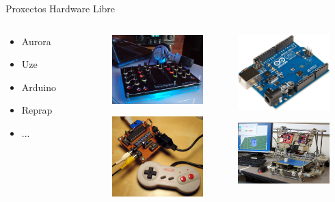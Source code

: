 \documentclass{beamer}
\begin{document}
\begin{frame}{Proxectos Hardware Libre}

\begin{columns}
\begin{column}{0.25\textwidth}
\begin{itemize}
\item Aurora
\item Uze
\item Arduino
\item Reprap
\item ...
\end{itemize}
\end{column}
\begin{column}{0.75\textwidth}

\begin{columns}
	\begin{column}{0.35\textwidth}
		\includegraphics[width=100pt]{./img/exemplo_Aurora.png}

		\includegraphics[width=100pt]{./img/exemplo_Uze.png}
	\end{column}
	\begin{column}{0.35\textwidth}
		\includegraphics[width=100pt]{./img/Arduino_Uno.png}

		\includegraphics[width=100pt]{./img/exemplo_RepRap_v2_Mendel.png}
	\end{column}
\end{columns}

\end{column}
\end{columns}


\end{frame}
\end{document}

